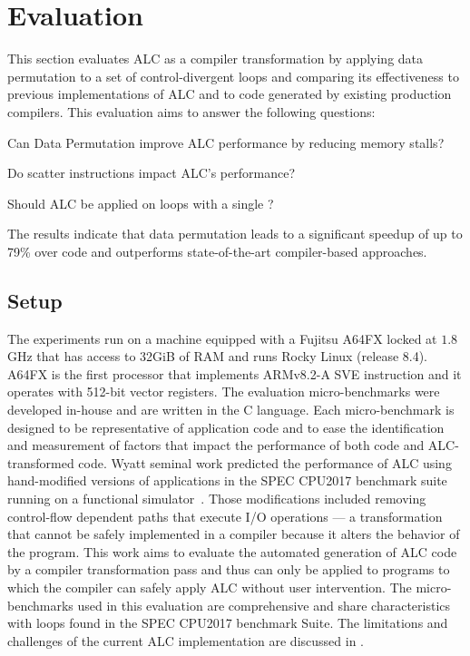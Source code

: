 \section{Evaluation}
\label{sec:evaluation}

This section evaluates ALC as a compiler transformation by applying data permutation to a set of control-divergent loops and comparing its effectiveness to previous implementations of ALC and to code generated by existing production compilers. 
This evaluation aims to answer the following questions:

\noindent{} Can Data Permutation improve ALC performance by reducing memory stalls?

\noindent{} Do scatter instructions impact ALC's performance?

\noindent{} Should ALC be applied on loops with a single \cpath?

The results indicate that data permutation leads to a significant speedup of up to 79\% over \ifconverted code and outperforms state-of-the-art compiler-based approaches.

\subsection{Setup}
\label{sec:setup}


The experiments run on a machine equipped with a Fujitsu A64FX locked at $1.8$GHz that has access to 32GiB of RAM and runs Rocky Linux (release 8.4).
A64FX is the first processor that implements ARMv8.2-A SVE instruction and it operates with 512-bit vector registers.
The evaluation micro-benchmarks were developed in-house and are written in the C language.
Each micro-benchmark is designed to be representative of application code and to ease the identification and measurement of factors that impact the performance of both \ifconverted code and ALC-transformed code.
Wyatt \etal seminal work predicted the performance of ALC using hand-modified versions of applications in the SPEC CPU2017 benchmark suite running on a functional simulator~\cite{spec}.
Those modifications included removing control-flow dependent paths that execute I/O operations --- a transformation that cannot be safely implemented in a compiler because it alters the behavior of the program.
This work aims to evaluate the automated generation of ALC code by a compiler transformation pass and thus can only be applied to programs to which the compiler can safely apply ALC without user intervention.
The micro-benchmarks used in this evaluation are comprehensive and share characteristics with loops found in the SPEC CPU2017 benchmark Suite.
The limitations and challenges of the current ALC implementation are discussed in .


